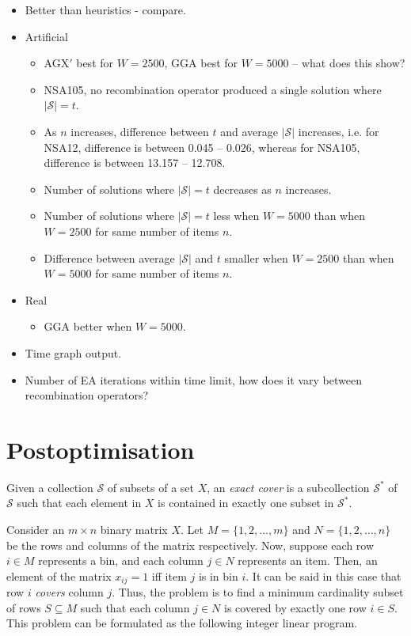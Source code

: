 \documentclass[authoryear]{elsarticle}
\begin{document}
{\color{myRed}
\begin{itemize}[leftmargin=*]
	\item Better than heuristics - compare.
	\item Artificial
	\begin{itemize}
		\item AGX$'$ best for $W=2500$, GGA best for $W=5000$ -- what does this show?
		\item NSA105, no recombination operator produced a single solution where $|\mathcal{S}| = t$.
		\item As $n$ increases, difference between $t$ and average $|\mathcal{S}|$ increases, i.e. for NSA12, difference is between 0.045 -- 0.026, whereas for NSA105, difference is between 13.157 -- 12.708.
		\item Number of solutions where $|\mathcal{S}| = t$ decreases as $n$ increases.
		\item Number of solutions where $|\mathcal{S}| = t$ less when $W=5000$ than when $W=2500$ for same number of items $n$.
		\item Difference between average $|\mathcal{S}|$ and $t$ smaller when $W=2500$ than when $W=5000$ for same number of items $n$.
	\end{itemize}
	\item Real
	\begin{itemize}
		\item GGA better when $W=5000$.
	\end{itemize}	
	\item Time graph output.
	\item Number of EA iterations within time limit, how does it vary between recombination operators?
\end{itemize}
}

\section{Postoptimisation}
\label{sec:postopt}
\noindent Given a collection $\mathcal{S}$ of subsets of a set $X$, an \emph{exact cover} is a subcollection $\mathcal{S}^*$ of $\mathcal{S}$ such that each element in $X$ is contained in exactly one subset in $\mathcal{S}^*$.

Consider an $m\times n$ binary matrix $X$. Let $M = \{1,2,\dotsc,m\}$ and $N = \{1,2,\dotsc,n\}$ be the rows and columns of the matrix respectively. Now, suppose each row $i \in M$ represents a bin, and each column $j \in N$ represents an item. Then, an element of the matrix $x_{ij} = 1$ iff item $j$ is in bin $i$. It can be said in this case that row $i$ \emph{covers} column $j$. Thus, the problem is to find a minimum cardinality subset of rows $S \subseteq M$ such that each column $j \in N$ is covered by exactly one row $i \in S$. This problem can be formulated as the following integer linear program.
\end{document}
